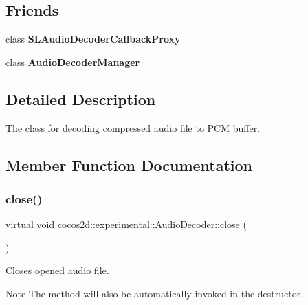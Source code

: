 \subsection*{Friends}
\begin{DoxyCompactItemize}
\item 
\mbox{\label{classcocos2d_1_1experimental_1_1AudioDecoder_a9305240815b13dd312f1afe1b3d7ddd8}} 
class {\bfseries S\+L\+Audio\+Decoder\+Callback\+Proxy}
\item 
\mbox{\label{classcocos2d_1_1experimental_1_1AudioDecoder_af7bd9270f880d1dc12f5f54d21b08711}} 
class {\bfseries Audio\+Decoder\+Manager}
\end{DoxyCompactItemize}


\subsection{Detailed Description}
The class for decoding compressed audio file to P\+CM buffer. 

\subsection{Member Function Documentation}
\mbox{\label{classcocos2d_1_1experimental_1_1AudioDecoder_a89e94516cd7103d98475dc27462a58a7}} 
\subsubsection{\texorpdfstring{close()}{close()}\hspace{0.1cm}{\footnotesize\ttfamily [1/2]}}
{\footnotesize\ttfamily virtual void cocos2d\+::experimental\+::\+Audio\+Decoder\+::close (\begin{DoxyParamCaption}{ }\end{DoxyParamCaption})\hspace{0.3cm}{\ttfamily [pure virtual]}}



Closes opened audio file. 

\begin{DoxyNote}{Note}
The method will also be automatically invoked in the destructor. 
\end{DoxyNote}


